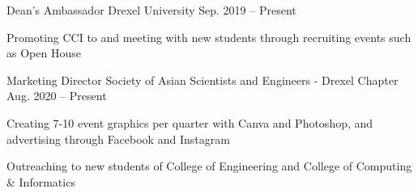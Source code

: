 
\begin{cvhonors}

  \cvhonor
  {Dean's Ambassador} %
  {Drexel University} %
  {Sep. 2019 -- Present} %
  {
    \begin{cvitems}
      \item{Promoting CCI to and meeting with new students through recruiting events such as Open House}
    \end{cvitems}
  } %

  \cvhonor
  {Marketing Director} %
  {Society of Asian Scientists and Engineers - Drexel Chapter} %
  {Aug. 2020 -- Present} %
  {
    \begin{cvitems}
      \item {Creating 7-10 event graphics per quarter with Canva and Photoshop, and advertising through Facebook and Instagram}
      \item {Outreaching to new students of College of Engineering and College of Computing \& Informatics}
    \end{cvitems}
  } %


\end{cvhonors}
